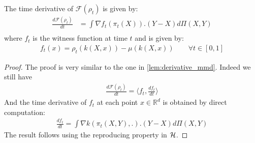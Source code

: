 \begin{lemma}\label{lem:time_derivative}
The time derivative of $\mathcal{F}(\rho_t)$ is given by:
	\begin{align*}
		\frac{d \mathcal{F}(\rho_t)}{dt}&=\int \nabla f_t(\pi_t(X)).(Y-X)d\Pi(X,Y)\\
	\end{align*}
	where $f_t$ is the witness function at time $t$ and is given by:
	\begin{align}
	f_t(x)=\rho_t(k(X,x))-\mu(k(X,x)) \qquad \forall t\in [0,1]
	\end{align}	
\end{lemma}
\begin{proof}
	The proof is very similar to the one in \cref{lem:derivative_mmd}. Indeed we still have
	\begin{align*}
		\frac{d \mathcal{F}(\rho_t)}{dt} = \langle f_t , \frac{df_t}{dt} \rangle
	\end{align*}
	And the time derivative of $f_t$ at each point $x\in\mathbb{R}^d$ is obtained by direct computation:
	\begin{align*}
		 \frac{df_t}{dt}= \int \nabla k(\pi_t(X,Y),.).(Y-X)d\Pi(X,Y)
	\end{align*}
	The result follows using the reproducing property in ${{\mathcal H}}$.
 \end{proof}




%

%

%







